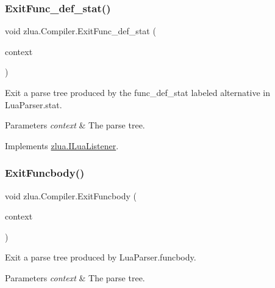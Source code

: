 \subsubsection{\texorpdfstring{Exit\+Func\+\_\+def\+\_\+stat()}{ExitFunc\_def\_stat()}}
{\footnotesize\ttfamily void zlua.\+Compiler.\+Exit\+Func\+\_\+def\+\_\+stat (\begin{DoxyParamCaption}\item[{\mbox{[}\+Not\+Null\mbox{]} \mbox{\hyperlink{classzlua_1_1_lua_parser_1_1_func__def__stat_context}{Lua\+Parser.\+Func\+\_\+def\+\_\+stat\+Context}}}]{context }\end{DoxyParamCaption})}



Exit a parse tree produced by the {\ttfamily func\+\_\+def\+\_\+stat} labeled alternative in Lua\+Parser.\+stat. 


\begin{DoxyParams}{Parameters}
{\em context} & The parse tree.\\
\hline
\end{DoxyParams}


Implements \mbox{\hyperlink{interfacezlua_1_1_i_lua_listener_a223ff1fef03cefaf9758254c32011257}{zlua.\+I\+Lua\+Listener}}.

\mbox{\label{classzlua_1_1_compiler_a42142f05b01646d0b407f241fd406939}} 
\subsubsection{\texorpdfstring{Exit\+Funcbody()}{ExitFuncbody()}}
{\footnotesize\ttfamily void zlua.\+Compiler.\+Exit\+Funcbody (\begin{DoxyParamCaption}\item[{\mbox{[}\+Not\+Null\mbox{]} \mbox{\hyperlink{classzlua_1_1_lua_parser_1_1_funcbody_context}{Lua\+Parser.\+Funcbody\+Context}}}]{context }\end{DoxyParamCaption})}



Exit a parse tree produced by Lua\+Parser.\+funcbody. 


\begin{DoxyParams}{Parameters}
{\em context} & The parse tree.\\
\hline
\end{DoxyParams}


